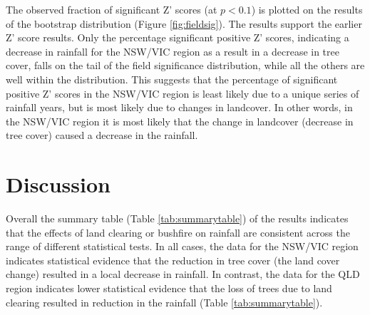 \documentclass[fleqn,10pt,lineno]{wlpeerj} %
\theoremstyle{definition}
\theoremstyle{definition}
\theoremstyle{definition}
\theoremstyle{remark}
\begin{document}
The observed fraction of significant Z' scores (at \(p < 0.1\)) is
plotted on the results of the bootstrap distribution (Figure
\ref{fig:fieldsig}). The results support the earlier Z' score results.
Only the percentage significant positive Z' scores, indicating a
decrease in rainfall for the NSW/VIC region as a result in a decrease in
tree cover, falls on the tail of the field significance distribution,
while all the others are well within the distribution. This suggests
that the percentage of significant positive Z' scores in the NSW/VIC
region is least likely due to a unique series of rainfall years, but is
most likely due to changes in landcover. In other words, in the NSW/VIC
region it is most likely that the change in landcover (decrease in tree
cover) caused a decrease in the rainfall.

\section{Discussion}\label{discussion}

\begin{table}[t]

\caption{\label{tab:summarytable}Summary table of all tests on the two regions }
\centering
{}
\end{table}

Overall the summary table (Table \ref{tab:summarytable}) of the results
indicates that the effects of land clearing or bushfire on rainfall are
consistent across the range of different statistical tests. In all
cases, the data for the NSW/VIC region indicates statistical evidence
that the reduction in tree cover (the land cover change) resulted in a
local decrease in rainfall. In contrast, the data for the QLD region
indicates lower statistical evidence that the loss of trees due to land
clearing resulted in reduction in the rainfall (Table
\ref{tab:summarytable}).
\end{document}
